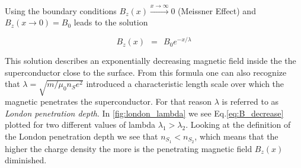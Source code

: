 \documentclass[10pt]{report}
\numberwithin{equation}{chapter}
\newcommand{\myEq}[1]{
  Eq.\ref{#1}
}
\begin{document}
Using the boundary conditions $B_z(x) \xrightarrow{x \rightarrow \infty} 0$ (Meissner Effect) and $B_z(x \rightarrow 0)=B_0$ leads to the solution

\begin{equation} \label{eq:B_decrease}
  B_z(x) ~~=~~ B_0 e^{-x/\lambda}
\end{equation}

This solution describes an exponentially decreasing magnetic field inside the the superconductor close to the surface. From this formula one can also recognize that $\lambda = \sqrt{m/\mu_0 n_S e^2}$ introduced a characteristic length scale over which the magnetic penetrates the superconductor. For that reason $\lambda$ is referred to as \textit{London penetration depth}. 
In \ref{fig:london_lambda} we see \myEq{eq:B_decrease} plotted for two different values of lambda $\lambda_1 > \lambda_2$. 
Looking at the definition of the London penetration depth we see that $n_{S_1} < n_{S_2}$, which means that the higher the charge density the more is the penetrating magnetic field $B_z(x)$ diminished.
\end{document}
